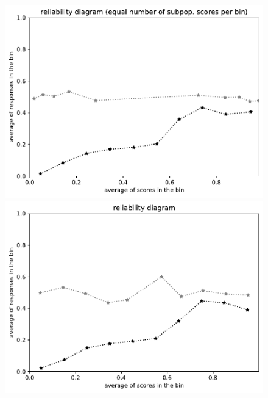 \documentclass{article}
\newlength{\vertsep}
\newlength{\imsize}
\begin{document}
\begin{figure}
\begin{centering}
\vspace{\vertsep}

\parbox{\imsize}{\includegraphics[width=\imsize]
{../codes/unweighted/10000_7000_10_2/equisamps.pdf}}
\quad\quad
\parbox{\imsize}{\includegraphics[width=\imsize]
{../codes/unweighted/10000_7000_10_2/equiscore.pdf}}

\vspace{\vertsep}


\end{centering}
\end{figure}
\end{document}
